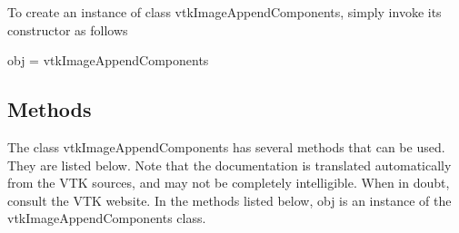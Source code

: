 To create an instance of class vtk\-Image\-Append\-Components, simply invoke its constructor as follows \begin{DoxyVerb}  obj = vtkImageAppendComponents
\end{DoxyVerb}
 \hypertarget{vtkwidgets_vtkxyplotwidget_Methods}{}\subsection{Methods}\label{vtkwidgets_vtkxyplotwidget_Methods}
The class vtk\-Image\-Append\-Components has several methods that can be used. They are listed below. Note that the documentation is translated automatically from the V\-T\-K sources, and may not be completely intelligible. When in doubt, consult the V\-T\-K website. In the methods listed below, {\ttfamily obj} is an instance of the vtk\-Image\-Append\-Components class. 

